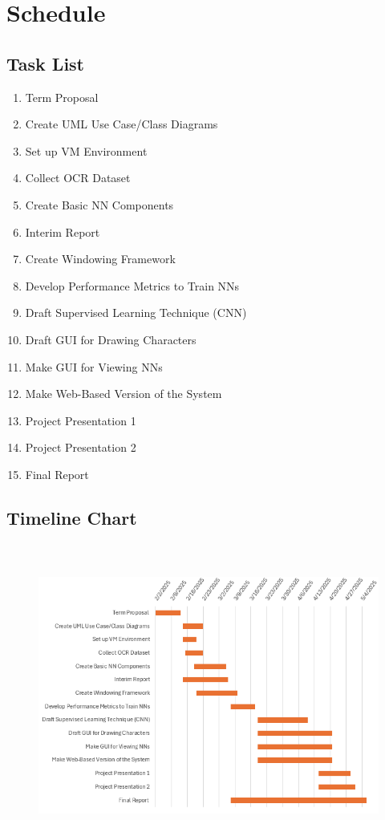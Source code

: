 \documentclass[english,12pt]{article}
\begin{document}
\section{Schedule}

\subsection{Task List}
\begin{enumerate}
    \item Term Proposal
    \item Create UML Use Case/Class Diagrams
    \item Set up VM Environment
    \item Collect OCR Dataset
    \item Create Basic NN Components
    \item Interim Report
    \item Create Windowing Framework
    \item Develop Performance Metrics to Train NNs
    \item Draft Supervised Learning Technique (CNN)
    \item Draft GUI for Drawing Characters
    \item Make GUI for Viewing NNs
    \item Make Web-Based Version of the System
    \item Project Presentation 1
    \item Project Presentation 2
    \item Final Report
\end{enumerate}

\subsection{Timeline Chart}
\begin{figure}[H]
  \includegraphics[width=15cm, height=10cm]{images/Colin's Gantt Chart.png}
\end{figure}
\end{document}
